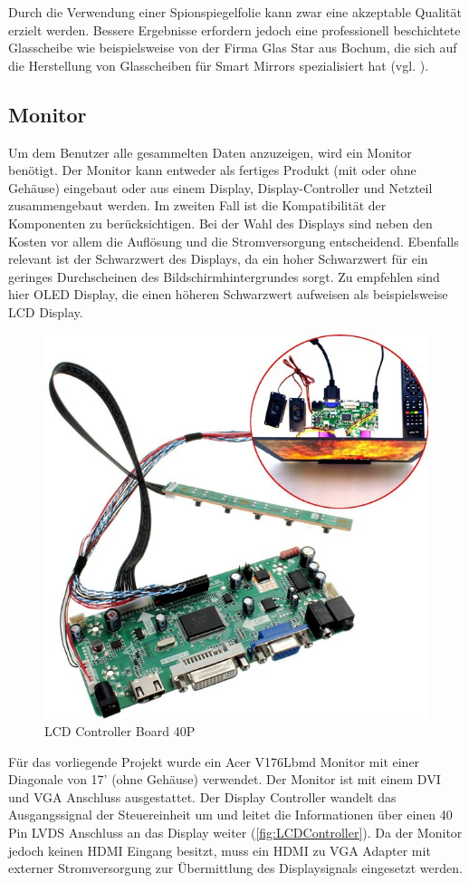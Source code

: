 Durch die Verwendung einer Spionspiegelfolie kann zwar eine akzeptable Qualität erzielt werden. Bessere Ergebnisse erfordern jedoch eine professionell beschichtete Glasscheibe wie beispielsweise von der Firma Glas Star aus Bochum, die sich auf die Herstellung von Glasscheiben für Smart Mirrors spezialisiert hat (vgl. \cite{glasstar}). 	

\subsection{Monitor}
Um dem Benutzer alle gesammelten Daten anzuzeigen, wird ein Monitor benötigt. Der Monitor kann entweder als fertiges Produkt (mit oder ohne Gehäuse) eingebaut oder aus einem Display,  Display-Controller und Netzteil zusammengebaut werden. Im zweiten Fall ist die Kompatibilität der Komponenten zu berücksichtigen. Bei der Wahl des Displays sind neben den Kosten vor allem die Auflösung und die Stromversorgung entscheidend. Ebenfalls relevant ist der Schwarzwert des Displays, da ein hoher Schwarzwert für ein geringes Durchscheinen des Bildschirmhintergrundes sorgt. Zu empfehlen sind hier OLED Display, die einen höheren Schwarzwert aufweisen als beispielsweise LCD Display.\cite{klein2008tft}  
\begin{figure}[H]
	\includegraphics[trim=0mm 0mm 0mm 0mm, scale=1]{bilder/dcontroller.jpg}
	\caption{LCD Controller Board 40P}
	\label{fig:LCDController}
\end{figure}
Für das vorliegende Projekt wurde ein Acer V176Lbmd Monitor mit einer Diagonale von 17' (ohne Gehäuse) verwendet. Der Monitor ist mit einem DVI und VGA Anschluss ausgestattet. Der Display Controller wandelt das Ausgangssignal der Steuereinheit um und leitet die Informationen über einen 40 Pin LVDS Anschluss an das Display weiter (\autoref{fig:LCDController}). Da der Monitor jedoch keinen HDMI Eingang besitzt, muss ein HDMI zu VGA Adapter mit externer Stromversorgung zur Übermittlung des Displaysignals eingesetzt werden.
 

